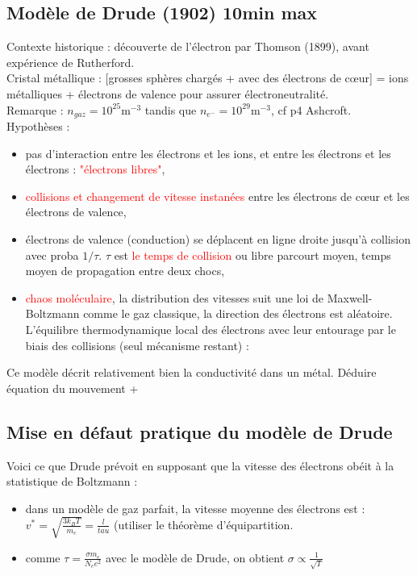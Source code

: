 \subsection{Modèle de Drude (1902) 10min max}
Contexte historique : découverte de l'électron par Thomson (1899), avant expérience de Rutherford.\\
Cristal métallique : [grosses sphères chargés + avec des électrons de c\oe ur] = ions métalliques  + électrons de valence pour assurer électroneutralité.\\
Remarque : $n_{gaz}=10^{25}$m$^{-3}$ tandis que $n_{e^{-}}=10^{29}$m$^{-3}$, cf p4 Ashcroft.\\
Hypothèses :\begin{itemize}
    \item pas d'interaction entre les électrons et les ions, et entre les électrons et les électrons : \textcolor{red}{"électrons libres"},
    \item \textcolor{red}{collisions et changement de vitesse instanées} entre les électrons de c\oe ur et les électrons de valence,
    \item électrons de valence (conduction) se déplacent en ligne droite jusqu'à collision avec proba $1/\tau$. $\tau$ est \textcolor{red}{le temps de collision} ou libre parcourt moyen, temps moyen de propagation entre deux chocs,
    \item \textcolor{red}{chaos moléculaire}, la distribution des vitesses suit une loi de Maxwell-Boltzmann comme le gaz classique, la direction des électrons est aléatoire. L'équilibre thermodynamique local des électrons avec leur entourage par le biais des collisions (seul mécanisme restant) : 
\end{itemize}

Ce modèle décrit relativement bien la conductivité dans un métal.
Déduire équation du mouvement + 
\subsection{Mise en défaut pratique du modèle de Drude}
Voici ce que Drude prévoit en supposant que la vitesse des électrons obéit à la statistique de Boltzmann :
\begin{itemize}
    \item dans un modèle de gaz parfait, la vitesse moyenne des électrons est : $v^*=\sqrt{\frac{3k_BT}{m_e}}=\frac{l}{tau}$ (utiliser le théorème d'équipartition.
    \item comme $\tau=\frac{\sigma m_e}{N_ee^2}$ avec le modèle de Drude, on obtient $\sigma\propto \frac{1}{\sqrt{T}}$
\end{itemize}

